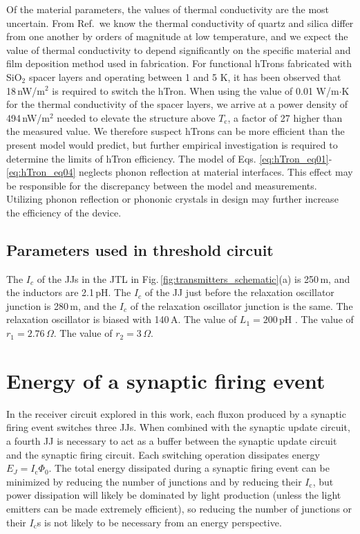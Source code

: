 \documentclass[twocolumn]{article}
\newcommand{\onlinecite}[1]{\hspace{-1 ex} \nocite{#1}\citenum{#1}}
\begin{document}
Of the material parameters, the values of thermal conductivity are the most uncertain. From Ref.\,\onlinecite{zepo1971} we know the thermal conductivity of quartz and silica differ from one another by orders of magnitude at low temperature, and we expect the value of thermal conductivity to depend significantly on the specific material and film deposition method used in fabrication. For functional hTrons fabricated with SiO$_2$ spacer layers and operating between 1 and 5 K, it has been observed \cite{mc2018} that 18\,nW/\textmu m$^2$ is required to switch the hTron. When using the value of 0.01 W/m$\cdot$K for the thermal conductivity of the spacer layers, we arrive at a power density of 494\,nW/\textmu m$^2$ needed to elevate the structure above $T_{\mathrm{c}}$, a factor of 27 higher than the measured value. We therefore suspect hTrons can be more efficient than the present model would predict, but further empirical investigation is required to determine the limits of hTron efficiency. The model of Eqs. \ref{eq:hTron_eq01}-\ref{eq:hTron_eq04} neglects phonon reflection at material interfaces. This effect may be responsible for the discrepancy between the model and measurements. Utilizing phonon reflection or phononic crystals in design may further increase the efficiency of the device.

\subsection{Parameters used in threshold circuit}
%
The $I_c$ of the JJs in the JTL in Fig.\,\ref{fig:transmitters_schematic}(a) is 250\,\textmu m, and the inductors are 2.1\,pH. The $I_c$ of the JJ just before the relaxation oscillator junction is 280\,\textmu m, and the $I_c$ of the relaxation oscillator junction is the same. The relaxation oscillator is biased with 140\,\textmu A. The value of $L_1 = 200$\,pH . The value of $r_1 = 2.76$\,$\Omega$. The value of $r_2 = 3$\,$\Omega$.

\section{\label{sec:appendix_energy}Energy of a synaptic firing event}
In the receiver circuit explored in this work, each fluxon produced by a synaptic firing event switches three JJs. When combined with the synaptic update circuit, a fourth JJ is necessary to act as a buffer between the synaptic update circuit and the synaptic firing circuit. Each switching operation dissipates energy $E_{J} = I_{\mathrm{c}} \Phi_{0}$. The total energy dissipated during a synaptic firing event can be minimized by reducing the number of junctions and by reducing their $I_{\mathrm{c}}$, but power dissipation will likely be dominated by light production (unless the light emitters can be made extremely efficient), so reducing the number of junctions or their $I_{\mathrm{c}}$s is not likely to be necessary from an energy perspective. 
\end{document}
